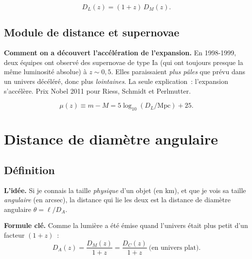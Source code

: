 \documentclass[11pt,a4paper,openany]{report}
\begin{document}
\begin{equation}
\boxed{\;D_{L}(z) = (1+z)\,D_{M}(z).\;}
\label{eq:DL}
\end{equation}

\section{Module de distance et supernovae}

\begin{tcolorbox}[vulgarisation]
\textbf{Comment on a découvert l'accélération de l'expansion.} En 1998-1999,
deux équipes ont observé des supernovae de type Ia (qui ont toujours
presque la même luminosité absolue) à $z\sim 0{,}5$. Elles paraissaient
\emph{plus pâles} que prévu dans un univers décéléré, donc plus
\emph{lointaines}. La seule explication~: l'expansion s'accélère. Prix Nobel
2011 pour Riess, Schmidt et Perlmutter.
\end{tcolorbox}

\begin{equation}
\mu(z) \equiv m - M = 5\log_{10}(D_{L}/\text{Mpc}) + 25.
\label{eq:mu}
\end{equation}

\chapter{Distance de diamètre angulaire}
\label{chap:DA}

\section{Définition}

\begin{tcolorbox}[vulgarisation]
\textbf{L'idée.} Si je connais la taille \emph{physique} d'un objet (en km),
et que je vois sa taille \emph{angulaire} (en arcsec), la distance qui lie les
deux est la distance de diamètre angulaire $\theta = \ell/D_{A}$.
\end{tcolorbox}

\begin{tcolorbox}[mathspe]
\textbf{Formule clé.} Comme la lumière a été émise quand l'univers
était plus petit d'un facteur $(1+z)$~:
\[
D_{A}(z) = \frac{D_{M}(z)}{1+z} = \frac{D_{C}(z)}{1+z}~\text{(en univers plat)}.
\]
\end{tcolorbox}
\end{document}
